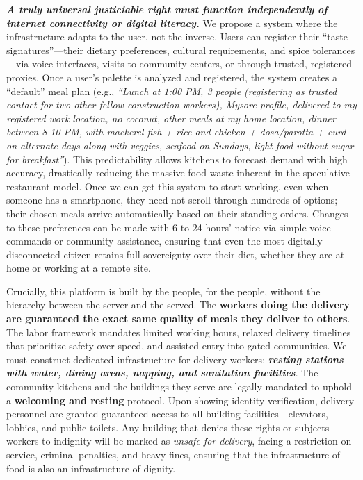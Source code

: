 \textbf{\emph{A truly universal justiciable right must function
independently of internet connectivity or digital literacy.}} We propose
a system where the infrastructure adapts to the user, not the inverse.
Users can register their ``taste signatures''---their dietary
preferences, cultural requirements, and spice tolerances---via voice
interfaces, visits to community centers, or through trusted, registered
proxies. Once a user's palette is analyzed and registered, the system
creates a ``default'' meal plan (e.g., \emph{``Lunch at 1:00 PM, 3
people (registering as trusted contact for two other fellow construction
workers), Mysore profile, delivered to my registered work location, no
coconut, other meals at my home location, dinner between 8-10 PM, with
mackerel fish + rice and chicken + dosa/parotta + curd on alternate days
along with veggies, seafood on Sundays, light food without sugar for
breakfast''}). This predictability allows kitchens to forecast demand
with high accuracy, drastically reducing the massive food waste inherent
in the speculative restaurant model. Once we can get this system to
start working, even when someone has a smartphone, they need not scroll
through hundreds of options; their chosen meals arrive automatically
based on their standing orders. Changes to these preferences can be made
with 6 to 24 hours' notice via simple voice commands or community
assistance, ensuring that even the most digitally disconnected citizen
retains full sovereignty over their diet, whether they are at home or
working at a remote site.

Crucially, this platform is built by the people, for the people, without
the hierarchy between the server and the served. The \textbf{workers
doing the delivery are guaranteed the exact same quality of meals they
deliver to others}. The labor framework mandates limited working hours,
relaxed delivery timelines that prioritize safety over speed, and
assisted entry into gated communities. We must construct dedicated
infrastructure for delivery workers: \textbf{\emph{resting stations with
water, dining areas, napping, and sanitation facilities}}. The community
kitchens and the buildings they serve are legally mandated to uphold a
\textbf{welcoming and resting} protocol. Upon showing identity
verification, delivery personnel are granted guaranteed access to all
building facilities---elevators, lobbies, and public toilets. Any
building that denies these rights or subjects workers to indignity will
be marked as \emph{unsafe for delivery}, facing a restriction on
service, criminal penalties, and heavy fines, ensuring that the
infrastructure of food is also an infrastructure of dignity.

